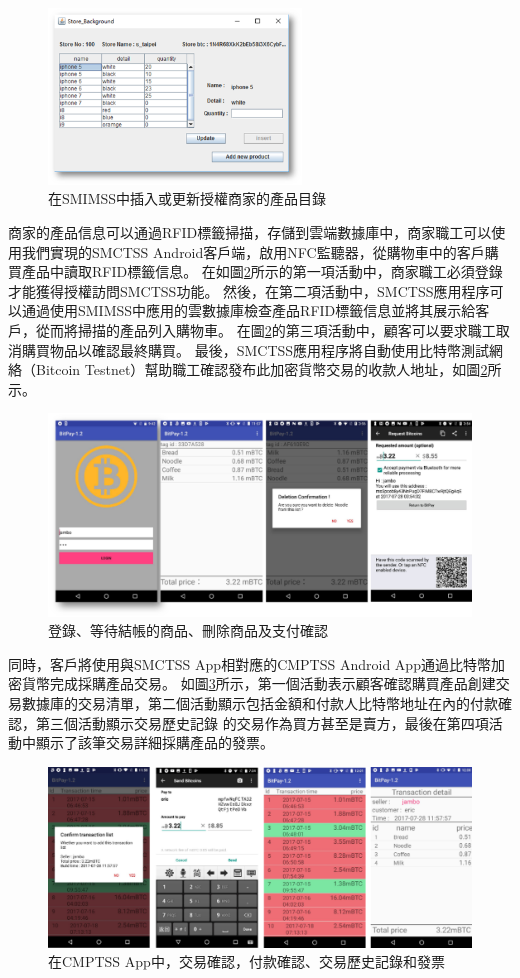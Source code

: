 \begin{figure}[htbp]
	\centering
	\includegraphics[width = 0.6\textwidth]{fig6.png}
	\caption{在SMIMSS中插入或更新授權商家的產品目錄}\label{fig6}
\end{figure}

商家的產品信息可以通過RFID標籤掃描，存儲到雲端數據庫中，商家職工可以使用我們實現的SMCTSS Android客戶端，啟用NFC監聽器，從購物車中的客戶購買產品中讀取RFID標籤信息。 在如圖\ref{fig7}所示的第一項活動中，商家職工必須登錄才能獲得授權訪問SMCTSS功能。 然後，在第二項活動中，SMCTSS應用程序可以通過使用SMIMSS中應用的雲數據庫檢查產品RFID標籤信息並將其展示給客戶，從而將掃描的產品列入購物車。 在圖\ref{fig7}的第三項活動中，顧客可以要求職工取消購買物品以確認最終購買。 最後，SMCTSS應用程序將自動使用比特幣測試網絡（Bitcoin Testnet）\supercite{bitcointestnet}幫助職工確認發布此加密貨幣交易的收款人地址，如圖\ref{fig7}所示。    

\begin{figure}[htbp]
	\centering
	\includegraphics[width = 1\textwidth]{fig7.png}
	\caption{登錄、等待結帳的商品、刪除商品及支付確認}\label{fig7}
\end{figure}

同時，客戶將使用與SMCTSS App相對應的CMPTSS Android App通過比特幣加密貨幣完成採購產品交易。 如圖\ref{fig8}所示，第一個活動表示顧客確認購買產品創建交易數據庫的交易清單，第二個活動顯示包括金額和付款人比特幣地址在內的付款確認，第三個活動顯示交易歷史記錄 的交易作為買方甚至是賣方，最後在第四項活動中顯示了該筆交易詳細採購產品的發票。    

\begin{figure}[htbp]
	\centering
	\includegraphics[width = 1\textwidth]{fig8.png}
	\caption{在CMPTSS App中，交易確認，付款確認、交易歷史記錄和發票}\label{fig8}
\end{figure}